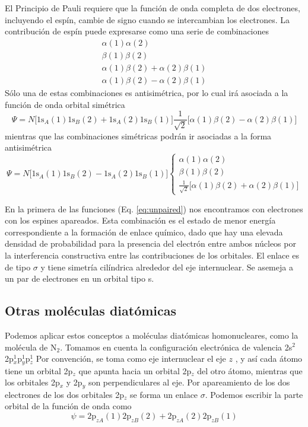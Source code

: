 El Principio de Pauli 
requiere que la función de onda completa de dos electrones, 
incluyendo el espín, cambie de signo cuando se intercambian 
los electrones. La contribución de espín puede expresarse
como una serie de combinaciones 
\begin{gather*}
\alpha(1)\alpha(2)\\
\beta (1)\beta (2)\\
\alpha(1)\beta(2) + \alpha(2)\beta(1)\\
\alpha(1)\beta(2) − \alpha(2)\beta(1)
\end{gather*}
Sólo una de estas combinaciones es antisimétrica, por lo cual
irá asociada a la función de onda orbital simétrica
\begin{equation}
    \Psi=N
    \big[\mathrm{1s}_A(1)\mathrm{1s}_B(2) +\mathrm{1s}_A(2)\mathrm{1s}_B(1)\big]
    \frac{1}{\sqrt{2}}\big[\alpha(1)\beta(2) − \alpha(2)\beta(1)\big]
    \label{eq:unpaired}
\end{equation}
mientras que las combinaciones simétricas podrán ir asociadas
a la forma antisimétrica
\begin{equation}
    \Psi=N
    \big[\mathrm{1s}_A(1)\mathrm{1s}_B(2) -\mathrm{1s}_A(2)\mathrm{1s}_B(1)\big]
\begin{cases}
\alpha(1)\alpha(2)\\
\beta (1)\beta (2)\\ 
\frac{1}{\sqrt{2}}\big[\alpha(1)\beta(2) + \alpha(2)\beta(1)\big]
\end{cases}
\end{equation}

En la primera de las funciones (Eq. \ref{eq:unpaired})
nos encontramos con electrones con los espines apareados.
Esta combinación es el estado de menor energía
correspondiente a la formación de enlace químico,
dado que hay una elevada densidad de 
probabilidad para la presencia del electrón entre ambos
núcleos por la interferencia constructiva entre las
contribuciones de los orbitales. El enlace es de tipo 
$\sigma$ y tiene simetría cilíndrica alrededor del eje
internuclear. Se asemeja a un par de electrones en 
un orbital tipo s.

\subsection{Otras moléculas diatómicas}
Podemos aplicar estos conceptos a moléculas diatómicas
homonucleares, como la molécula de N$_2$. Tomamos en 
cuenta la configuración electrónica de valencia
2s$^2$2p$_x^1$p$_y^1$p$_z^1$
Por convención, se toma como eje internuclear el eje $z$ ,
y así cada átomo tiene un orbital 2p$_z$ que apunta 
hacia un orbital 2p$_z$ del otro átomo, mientras que 
los orbitales 2p$_x$ y 2p$_y$ son perpendiculares al eje. 
Por apareamiento de los dos electrones de los dos orbitales 
2p$_z$ se forma un enlace $\sigma$. Podemos escribir la
parte orbital de la función de onda como
\begin{equation}
 \psi =2\mathrm{p}_{zA}(1)2\mathrm{p}_{zB}(2) + 2\mathrm{p}_{zA}(2)2\mathrm{p}_{zB}(1)
\end{equation} 

